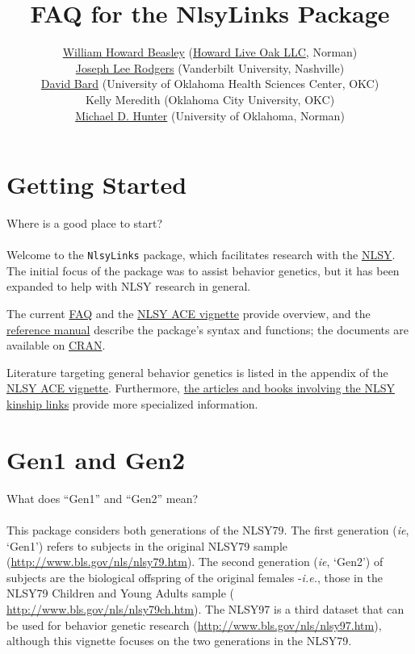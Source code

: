 \documentclass{article}\usepackage[]{graphicx}\usepackage[]{color}
\title{FAQ for the NlsyLinks Package}
\author{
  \href{http://scholar.google.com/citations?user=ffsJTC0AAAAJ}{William Howard Beasley} (\href{http://howardliveoak.com/}{Howard Live Oak LLC}, Norman)\\
  \href{http://www.vanderbilt.edu/psychological_sciences/bio/joe-rodgers}{Joseph Lee Rodgers} (Vanderbilt University, Nashville)\\
  \href{http://find.ouhsc.edu/Faculty.aspx?FacultyID=1041}{David Bard} (University of Oklahoma Health Sciences Center, OKC)\\
  Kelly Meredith (Oklahoma City University, OKC)\\
  \href{http://students.ou.edu/H/Michael.D.Hunter-1/}{Michael D. Hunter} (University of Oklahoma, Norman)
}
\begin{document}
\newcommand{\code}[1]{\texttt{\small{#1}}}
\newcommand{\pkg}[1]{\textsf{\small{#1}}}
\newcommand{\R}{\textsf{R}} %

\maketitle
\tableofcontents



\section{Getting Started}
\textsf{Where is a good place to start?}\\ \\
Welcome to the \code{NlsyLinks} package, which facilitates research with the \href{http://www.bls.gov/nls/home.htm}{NLSY}.  The initial focus of the package was to assist behavior genetics, but it has been expanded to help with NLSY research in general.

The current \href{http://cran.r-project.org/web/packages/NlsyLinks/vignettes/Faq.pdf}{FAQ} and the \href{http://cran.r-project.org/web/packages/NlsyLinks/vignettes/NlsyAce.pdf}{NLSY ACE vignette} provide overview, and the \href{http://cran.r-project.org/web/packages/NlsyLinks/NlsyLinks.pdf}{reference manual} describe the package's syntax and functions; the documents are available on \href{http://cran.r-project.org/web/packages/NlsyLinks/}{CRAN}.  

Literature targeting general behavior genetics is listed in the appendix of the \href{http://cran.r-project.org/web/packages/NlsyLinks/vignettes/NlsyAce.pdf}{NLSY ACE vignette}.  Furthermore, \href{https://github.com/LiveOak/NlsyLinksDetermination/wiki/Articles}{the articles and books involving the NLSY kinship links} provide more specialized information.

\section{Gen1 and Gen2}
\textsf{What does ``Gen1'' and ``Gen2'' mean?}\\ \\
This package considers both generations of the NLSY79.  The first generation (\emph{ie}, `Gen1') refers to subjects in the original NLSY79 sample (\url{http://www.bls.gov/nls/nlsy79.htm}).  The second generation (\emph{ie}, `Gen2') of subjects are the biological offspring of the original females -\emph{i.e.}, those in the NLSY79 Children and Young Adults sample ( \url{http://www.bls.gov/nls/nlsy79ch.htm}).  The NLSY97 is a third dataset that can be used for behavior genetic research (\url{http://www.bls.gov/nls/nlsy97.htm}), although this vignette focuses on the two generations in the NLSY79.
\end{document}
